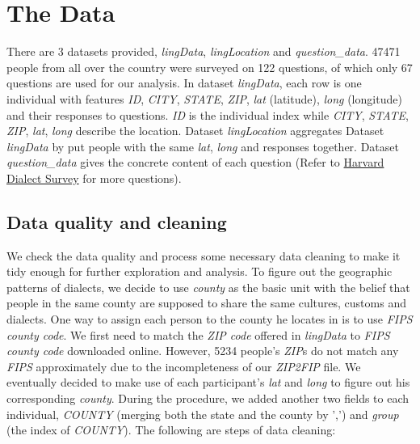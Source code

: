 \section{The Data}
\label{sec:data}

\qquad There are 3 datasets provided, \textit{lingData}, \textit{lingLocation} and \textit{question\_data}. 47471 people from all over the country were surveyed on 122 questions, of which only 67 questions are used for our analysis. 
In dataset \textit{lingData}, each row is one individual with features \textit{ID}, \textit{CITY}, \textit{STATE}, \textit{ZIP}, \textit{lat} (latitude), \textit{long} (longitude) and their responses to questions. 
\textit{ID} is the individual index while \textit{CITY}, \textit{STATE}, \textit{ZIP}, \textit{lat}, \textit{long} describe the location. Dataset \textit{lingLocation} aggregates Dataset \textit{lingData} by put people with the same \textit{lat}, \textit{long} and responses together. Dataset \textit{question\_data} gives the concrete content of each question (Refer to \href{http://dialect.redlog.net/index.html}{Harvard Dialect Survey} for more questions).

\subsection{Data quality and cleaning}
\qquad We check the data quality and process some necessary data cleaning to make it tidy enough for further exploration and analysis. To figure out the geographic patterns of dialects, we decide to use \textit{county} as the basic unit with the belief that people in the same county are supposed to share the same cultures, customs and dialects. One way to assign each person to the county he locates in is to use \textit{FIPS county code}. We first need to match the \textit{ZIP code} offered in \textit{lingData} to \textit{FIPS county code} downloaded online. However, 5234 people's \textit{ZIP}s do not match any \textit{FIPS} approximately due to the incompleteness of our \textit{ZIP2FIP} file. We eventually decided to make use of each participant's \textit{lat} and \textit{long} to figure out his corresponding \textit{county}. During the procedure, we added another two fields to each individual, \textit{COUNTY} (merging both the state and the county by ',') and \textit{group} (the index of \textit{COUNTY}). The following are steps of data cleaning:

